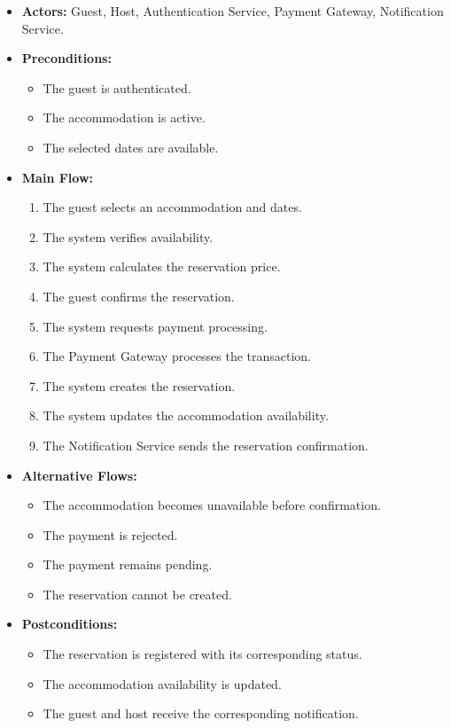 \begin{itemize}
    \item \textbf{Actors:} Guest, Host, Authentication Service, Payment Gateway, Notification Service.
    
    \item \textbf{Preconditions:}
    \begin{itemize}
        \item The guest is authenticated.
        \item The accommodation is active.
        \item The selected dates are available.
    \end{itemize}
    
    \item \textbf{Main Flow:}
    \begin{enumerate}
        \item The guest selects an accommodation and dates.
        \item The system verifies availability.
        \item The system calculates the reservation price.
        \item The guest confirms the reservation.
        \item The system requests payment processing.
        \item The Payment Gateway processes the transaction.
        \item The system creates the reservation.
        \item The system updates the accommodation availability.
        \item The Notification Service sends the reservation confirmation.
    \end{enumerate}
    
    \item \textbf{Alternative Flows:}
    \begin{itemize}
        \item The accommodation becomes unavailable before confirmation.
        \item The payment is rejected.
        \item The payment remains pending.
        \item The reservation cannot be created.
    \end{itemize}
    
    \item \textbf{Postconditions:}
    \begin{itemize}
        \item The reservation is registered with its corresponding status.
        \item The accommodation availability is updated.
        \item The guest and host receive the corresponding notification.
    \end{itemize}
\end{itemize}


